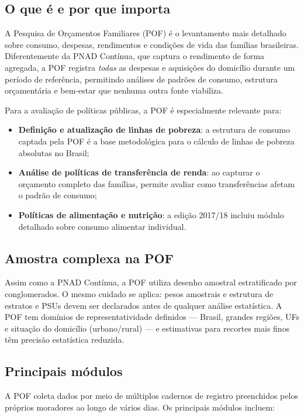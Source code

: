 \subsection{O que é e por que importa}

A Pesquisa de Orçamentos Familiares (POF) é o levantamento mais detalhado sobre consumo, despesas, rendimentos e condições de vida das famílias brasileiras. Diferentemente da PNAD Contínua, que captura o rendimento de forma agregada, a POF registra \textit{todas} as despesas e aquisições do domicílio durante um período de referência, permitindo análises de padrões de consumo, estrutura orçamentária e bem-estar que nenhuma outra fonte viabiliza.

Para a avaliação de políticas públicas, a POF é especialmente relevante para:

\begin{itemize}
  \item \textbf{Definição e atualização de linhas de pobreza}: a estrutura de consumo captada pela POF é a base metodológica para o cálculo de linhas de pobreza absolutas no Brasil;
  \item \textbf{Análise de políticas de transferência de renda}: ao capturar o orçamento completo das famílias, permite avaliar como transferências afetam o padrão de consumo;
  \item \textbf{Políticas de alimentação e nutrição}: a edição 2017/18 incluiu módulo detalhado sobre consumo alimentar individual.
\end{itemize}

\subsection{Amostra complexa na POF}

Assim como a PNAD Contínua, a POF utiliza desenho amostral estratificado por conglomerados. O mesmo cuidado se aplica: pesos amostrais e estrutura de estratos e PSUs devem ser declarados antes de qualquer análise estatística. A POF tem domínios de representatividade definidos --- Brasil, grandes regiões, UFs e situação do domicílio (urbano/rural) --- e estimativas para recortes mais finos têm precisão estatística reduzida.

\subsection{Principais módulos}

A POF coleta dados por meio de múltiplos cadernos de registro preenchidos pelos próprios moradores ao longo de vários dias. Os principais módulos incluem:

